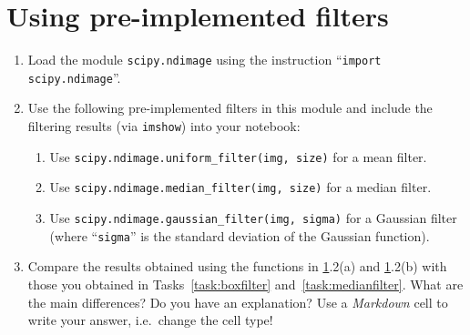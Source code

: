 \documentclass[12pt,a4paper]{article}
\begin{document}
\section{Using pre-implemented filters}
\label{task:ndi}
\begin{enumerate}
    \item Load the module \texttt{scipy.ndimage} using the instruction ``\texttt{import scipy.ndimage}''.
    \item Use the following pre-implemented filters in this module and include the filtering results (via \texttt{imshow}) into your notebook:
    \begin{enumerate}
        \item Use \texttt{scipy.ndimage.uniform\_filter(img, size)} for a mean filter.
        \item Use \texttt{scipy.ndimage.median\_filter(img, size)} for a median filter.
        \item Use \texttt{scipy.ndimage.gaussian\_filter(img, sigma)} for a Gaussian filter\\(where ``\texttt{sigma}'' is the standard deviation of the Gaussian function).
    \end{enumerate}
    \item Compare the results obtained using the functions in \ref{task:ndi}.2(a) and \ref{task:ndi}.2(b) with those you obtained in Tasks~\ref{task:boxfilter} and~\ref{task:medianfilter}. What are the main differences? Do you have an explanation? Use a \emph{Markdown} cell to write your answer, i.e.\ change the cell type!
\end{enumerate}
\end{document}
